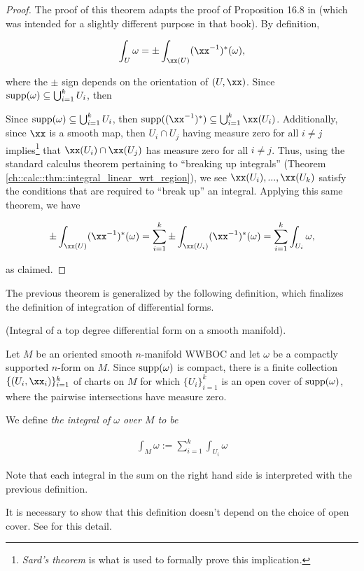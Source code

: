 \begin{proof}
    The proof of this theorem adapts the proof of Proposition 16.8 in \cite{book::SM} (which was intended for a slightly different purpose in that book). By definition,
    
    \begin{align*}
        \int_U \omega = \pm \int_{\xx(U)} (\xx^{-1})^*(\omega),
    \end{align*}
    
    where the $\pm$ sign depends on the orientation of $(U, \xx)$. Since $\text{supp}(\omega) \subseteq \bigcup_{i = 1}^k U_i$, then
    
    Since $\text{supp}(\omega) \subseteq \bigcup_{i = 1}^k U_i$, then $\supp((\xx^{-1})^*) \subseteq \bigcup_{i = 1}^k \xx(U_i)$. Additionally, since $\xx$ is a smooth map, then $U_i \cap U_j$ having measure zero for all $i \neq j$ implies\footnote{\textit{Sard's theorem} is what is used to formally prove this implication.} that $\xx(U_i) \cap \xx(U_j)$ has measure zero for all $i \neq j$. Thus, using the standard calculus theorem pertaining to ``breaking up integrals'' (Theorem \ref{ch::calc::thm::integral_linear_wrt_region}), we see $\xx(U_i), ..., \xx(U_k)$ satisfy the conditions that are required to ``break up'' an integral. Applying this same theorem, we have
    
    \begin{align*}
        \pm \int_{\xx(U)} (\xx^{-1})^*(\omega) 
        = \sum_{i = 1}^k \pm \int_{\xx(U_i)} (\xx^{-1})^*(\omega)
        = \sum_{i = 1}^k \int_{U_i} \omega,
    \end{align*}
    
    as claimed.
\end{proof}

The previous theorem is generalized by the following definition, which finalizes the definition of integration of differential forms.

\begin{defn}
\label{ch::diff_forms::defn::integral_over_manifold}
     (Integral of a top degree differential form on a smooth manifold).
    
    Let $M$ be an oriented smooth $n$-manifold WWBOC and let $\omega$ be a compactly supported $n$-form on $M$. Since $\text{supp}(\omega)$ is compact, there is a finite collection $\{(U_i, \xx_i)\}_{i = 1}^k$ of charts on $M$ for which $\{U_i\}_{i = 1}^k$ is an open cover of $\text{supp}(\omega)$, where the pairwise intersections have measure zero.
    
    We define \textit{the integral of $\omega$ over $M$ to be}
    
    \begin{align*}
        \boxed
        {
            \int_M \omega := \sum_{i = 1}^k \int_{U_i} \omega
        }
    \end{align*}
    
    Note that each integral in the sum on the right hand side is interpreted with the previous definition.
    
    It is necessary to show that this definition doesn't depend on the choice of open cover. See \cite{Lee} for this detail.
\end{defn}

